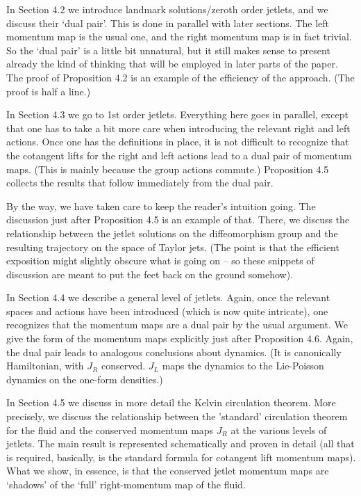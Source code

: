 \documentclass[12pt]{amsart}
\begin{document}
In Section 4.2 we introduce landmark solutions/zeroth order jetlets, and we discuss their `dual pair'. This is done in parallel with later sections. The left momentum map is the usual one, and the right momentum map is in fact trivial. So the `dual pair' is a little bit unnatural, but it still makes sense to present already the kind of thinking that will be employed in later parts of the paper. 
%
The proof of Proposition 4.2 is an example of the efficiency of the approach. (The proof is half a line.)

In Section 4.3 we go to 1st order jetlets. Everything here goes in parallel, except that one has to take a bit more care when introducing the relevant right and left actions. Once one has the definitions in place, it is not difficult to recognize that the cotangent lifts for the right and left actions lead to a dual pair of momentum maps. (This is mainly because the group actions commute.) Proposition 4.5 collects the results that follow immediately from the dual pair.

By the way, we have taken care to keep the reader's intuition going. The discussion just after Proposition 4.5 is an example of that. There, we discuss the relationship between the jetlet solutions on the diffeomorphism group and the resulting trajectory on the space of Taylor jets. (The point is that the efficient exposition might slightly obscure what is going on -- so these snippets of discussion are meant to put the feet back on the ground somehow).

In Section 4.4 we describe a general level of jetlets. Again, once the relevant spaces and actions have been introduced (which is now quite intricate), one recognizes that the momentum maps are a dual pair by the usual argument. We give the form of the momentum maps explicitly just after Proposition 4.6. Again, the dual pair leads to analogous conclusions about dynamics. (It is canonically Hamiltonian, with $J_R$  conserved. $J_L$ maps the dynamics to the Lie-Poisson dynamics on the one-form densities.)

In Section 4.5 we discuss in more detail the Kelvin circulation theorem. More precisely, we discuss the relationship between the 'standard' circulation theorem for the fluid and the conserved momentum maps $J_R$  at the various levels of jetlets. The main result is represented schematically and proven in detail (all that is required, basically, is the standard formula for cotangent lift momentum maps). What we show, in essence, is that the conserved jetlet momentum maps are `shadows' of the `full' right-momentum map of the fluid.\\
\end{document}
